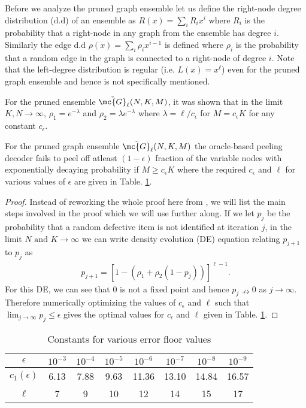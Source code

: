 \documentclass[conference,,twocolumn]{IEEEtran}
\def\ceps{c_{\epsilon}}
\begin{document}
Before we analyze the pruned graph ensemble let us define the right-node degree distribution (d.d) of an ensemble as $R(x)=\sum_{i}R_i x^i$ where $R_i$ is the probability that a right-node in any graph from the ensemble has degree $i$. Similarly the edge d.d $\rho(x)=\sum_{i}\rho_ix^{i-1}$ is defined where $\rho_i$ is the probability that a random edge in the graph is connected to a right-node of degree $i$. Note that the left-degree distribution is regular (i.e. $L(x)=x^\ell$) even for the pruned graph ensemble and hence is not specifically mentioned.

\begin{lemma}
For the pruned ensemble $\tilde{\mc{G}}_{\ell}(N,K,M)$, it was shown that in the limit $K,N\rightarrow\infty$, $\rho_{1}=e^{-\lambda}$ and $\rho_{2}=\lambda e^{-\lambda}$ where $\lambda=\ell/\ceps$ for $M=\ceps K$ for any constant $\ceps$. 
\end{lemma}

\begin{lemma}
\label{Lem:PeelingAnalysisLeftRegular}
For the pruned graph ensemble $\tilde{\mc{G}}_{\ell}(N, K,M)$ the oracle-based peeling decoder fails to peel off atleast $(1-\epsilon)$ fraction of the variable nodes with exponentially decaying probability if $M\geq \ceps K$ where the required $\ceps$ and $\ell$ for various values of $\epsilon$ are given in Table. \ref{Table:constantsDE}.
\end{lemma}
\begin{proof}
Instead of reworking the whole proof here from \cite{lee2015saffron}, we will list the main steps involved in the proof which we will use further along. If we let $p_j$ be the probability that a random defective item is not identified at iteration $j$, in the limit $N \text{ and } K\rightarrow \infty$ we can write density evolution (DE) equation relating $p_{j+1}$ to $p_{j}$ as 
\begin{align*}
p_{j+1}=\left[1-(\rho_1+\rho_2(1-p_j))\right]^{\ell-1}.
\end{align*}
For this DE, we can see that $0$ is not a fixed point and hence $p_j\nrightarrow 0$ as $j\rightarrow\infty$. Therefore numerically optimizing the values of $\ceps$ and $\ell$ such that $\lim_{j\rightarrow\infty}p_j\leq \epsilon$ gives the optimal values for $\ceps$ and $\ell$ given in Table. \ref{Table:constantsDE}.
\end{proof}

\begin{table}[t]
\centering
\begin{tabular}{| c | c | c | c | c | c | c | c | }
\hline
$\epsilon$ & $10^{-3}$ & $10^{-4}$ & $10^{-5}$ & $10^{-6}$ &$ 10^{-7}$ & $10^{-8}$ & $10^{-9}$ \\ \hline
$c_1(\epsilon)$ & 6.13 & 7.88 & 9.63 & 11.36 & 13.10 & 14.84 & 16.57 \\ \hline
 $\ell$ & 7 & 9 & 10 & 12 & 14 & 15 & 17 \\ \hline
\end{tabular}
\vspace{1ex}
\caption{Constants for various error floor values}
\label{Table:constantsDE}
\end{table}
\end{document}
